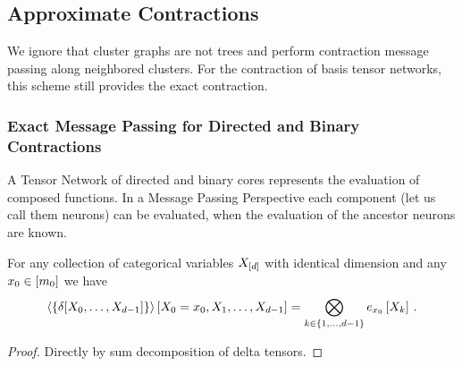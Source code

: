 \subsection{Approximate Contractions}

We ignore that cluster graphs are not trees and perform contraction message passing along neighbored clusters.
For the contraction of basis tensor networks, this scheme still provides the exact contraction.

\subsubsection{Exact Message Passing for Directed and Binary Contractions}


A Tensor Network of directed and binary cores represents the evaluation of composed functions.
In a Message Passing Perspective each component (let us call them neurons) can be evaluated, when the evaluation of the ancestor neurons are known.

\begin{lemma}\label{lem:diracConBasis}
	For any collection of categorical variables $X_{[d]}$ with identical dimension and any $x_{0}\in[m_{0}]$ we have
		\[ \left\langle \left\{\delta[X_{0},\ldots,X_{d-1}]\right\}\right\rangle \left[ X_{0}=x_{0},X_{1},\ldots,X_{d-1} \right] 
		= \bigotimes_{k\in\{1,\ldots,d-1\}} e_{x_{0}}\left[X_{k}\right] \, . \]
\end{lemma}
\begin{proof}
	Directly by sum decomposition of delta tensors.
\end{proof}

